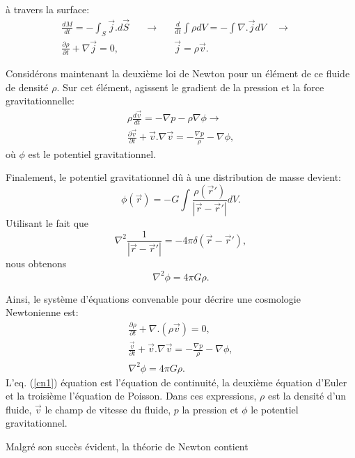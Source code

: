 \documentclass[a4paper,12pt]{report}
\theoremstyle{plain}
\theoremstyle{plain}
\begin{document}
\`a travers la surface: 
\begin{eqnarray}
\frac{dM}{dt} = - \int_S \vec j. d\vec S \quad &\rightarrow& \quad
\frac{d}{dt}\int\rho dV = - \int\nabla. \vec j dV \quad \rightarrow
\quad \nonumber\\
\frac{\partial\rho}{\partial t} + \nabla\vec j = 0, \quad & & \quad
\vec j = \rho\vec v. 
\end{eqnarray}
\par
Consid\'erons maintenant la deuxi\`eme loi de Newton pour un
\'el\'ement de ce fluide de densit\'e $\rho$.  Sur cet \'el\'ement, 
agissent le gradient de la pression et la force gravitationnelle: 
\begin{eqnarray}
\rho\frac{d\vec v}{dt} = - \nabla p - \rho\nabla\phi \rightarrow
\nonumber\\
\frac{\partial\vec v}{\partial t} + \vec v. \nabla \vec v = -
\frac{\nabla p}{\rho} - \nabla\phi, 
\end{eqnarray}
o\`u $\phi$ est le potentiel gravitationnel. 
\par
Finalement,  le potentiel gravitationnel d\^u \`a une distribution
de masse devient:
\begin{equation}
\phi(\vec r) = - G\int \frac{\rho(\vec r')}{|\vec r - \vec r'|}dV
.
\end{equation}
Utilisant le fait que
\begin{equation}
\nabla^2\frac{1}{|\vec r - \vec r'|} = - 4\pi\delta(\vec r - \vec
r'), 
\end{equation}
nous obtenons
\begin{equation}
\nabla^2\phi = 4\pi G\rho.
\end{equation}
\par
Ainsi,  le syst\`eme d'\'equations convenable pour d\'ecrire une
cosmologie Newtonienne est: 
\begin{eqnarray}
\label{cn1}
\frac{\partial\rho}{\partial t} + \nabla. (\rho\vec v) = 0, \\
\label{cn2} \frac{\vec v}{\partial t} + \vec v. \nabla \vec v =
- \frac{\nabla p}{\rho} - \nabla\phi, \\
\label{cn3} \nabla^2\phi = 4\pi G\rho.
\end{eqnarray}
L'eq. (\ref{cn1}) \'equation est l'\'equation de continuit\'e,  la
deuxi\`eme \'equation d'Euler et la troisi\`eme l'\'equation de
Poisson.  Dans ces expressions,  $\rho$ est la densit\'e d'un
fluide,  $\vec v$ le champ de vitesse du fluide,  $p$ la pression et
$\phi$ le potentiel gravitationnel. 
\par
Malgr\'e son succ\`es \'evident,  la th\'eorie de Newton contient
\end{document}
